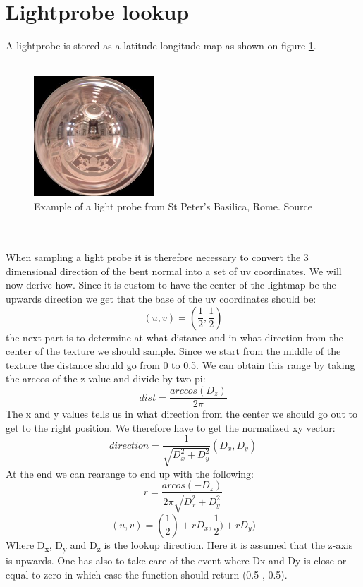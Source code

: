 \section{Lightprobe lookup}
A lightprobe is stored as a latitude longitude map as shown on figure \ref{fig:probe}.
\\ \\
\begin{figure}[h]
	\centering
	\includegraphics[width=0.4\textwidth]{Theory/example_probe}
\caption{Example of a light probe from St Peter's Basilica, Rome. Source\cite{website:PaulDebevec}}\label{fig:probe}
\end{figure}
\\ \\
When sampling a light probe it is therefore necessary to convert the 3 dimensional direction of the bent normal into a set of uv coordinates. We will now derive how. Since it is custom to have the center of the lightmap be the upwards direction we get that the base of the uv coordinates should be:
\[
(u,v) = (\frac{1}{2}, \frac{1}{2})
\]
the next part is to determine at what distance and in what direction from the center of the texture we should sample. Since we start from the middle of the texture the distance should go from 0 to 0.5. We can obtain this range by taking the arccos of the z value and divide by two pi:
\[
dist = \frac{arccos(D_z)}{2\pi}
\]
The x and y values tells us in what direction from the center we should go out to get to the right position. We therefore have to get the normalized xy vector:
\[
direction = \frac{1}{\sqrt{D_x^2 +D_y^2}} (D_x,D_y)
\]
At the end we can rearange to end up with the following:
\[
r = \frac{arcos(-D_z)}{2\pi\sqrt{D_x^2 + D_y^2}} 
\] \[
(u,v) = (\frac{1}{2}) + rD_x,\frac{1}{2}) + rD_y)
\]
Where D\textsubscript{x}, D\textsubscript{y} and D\textsubscript{z} is the lookup direction. Here it is assumed that the z-axis is upwards. One has also to take care of the event where Dx and Dy is close or equal to zero in which case the function should return (0.5 , 0.5). \newpage
